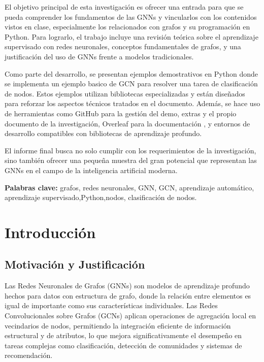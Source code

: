 \documentclass[11pt]{article} %
\begin{document}
El objetivo principal de esta investigación es ofrecer una entrada para que se pueda comprender los fundamentos de las GNNs y vincularlos con los contenidos vistos en clase, especialmente los relacionados con grafos y su programación en Python. Para lograrlo, el trabajo incluye una revisión teórica sobre el aprendizaje supervisado con redes neuronales, conceptos fundamentales de grafos, y una justificación del uso de GNNs frente a modelos tradicionales.

Como parte del desarrollo, se presentan ejemplos demostrativos en Python donde se implementa un ejemplo basico de GCN para resolver una tarea de clasificación de nodos. Estos ejemplos utilizan bibliotecas especializadas y están diseñados para reforzar los aspectos técnicos tratados en el documento. Además, se hace uso de herramientas como GitHub para la gestión del demo, extras y el propio documento de la investigación, Overleaf para la documentación , y entornos de desarrollo compatibles con bibliotecas de aprendizaje profundo.

El informe final busca no solo cumplir con los requerimientos de la investigación, sino también ofrecer una pequeña muestra del gran potencial que representan las GNNs en el campo de la inteligencia artificial moderna.

\vspace{5pt}
\textbf{Palabras clave:} grafos, redes neuronales, GNN, GCN, aprendizaje automático, aprendizaje supervisado,Python,nodos, clasificación de nodos.

\newpage
\tableofcontents
\listoftables
\listoffigures
\newpage
\section{Introducción}
\vspace{5pt}

\subsection{Motivación y Justificación}
\vspace{1pt}
Las Redes Neuronales de Grafos (GNNs) son modelos de aprendizaje profundo hechos para datos con estructura de grafo, donde la relación entre elementos es igual de importante como sus características individuales. Las Redes Convolucionales sobre Grafos (GCNs) aplican operaciones de agregación local en vecindarios de nodos, permitiendo la integración eficiente de información estructural y de atributos, lo que mejora significativamente el desempeño en tareas complejas como clasificación, detección de comunidades y sistemas de recomendación.
\end{document}
